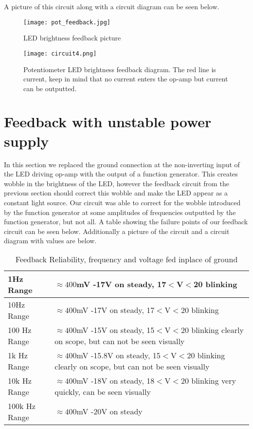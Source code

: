 \documentclass[prl,12pt,notitlepage,aps,onecolumn,superscriptaddress]{revtex4-1}
\begin{document}
A picture of this circuit along with a circuit diagram can be seen below.

\begin{figure}[H]
\begin{center}
\texttt{[image: pot\_feedback.jpg]}
\end{center}
\caption{\label{fig:pic} LED brightness feedback picture}
\end{figure}

\begin{figure}[H]
\begin{center}
\texttt{[image: circuit4.png]}
\end{center}
\caption{\label{fig:pic} Potentiometer LED brightness feedback diagram. The red line is current, keep in mind that no current enters the op-amp but current can be outputted.}
\end{figure}

\section{Feedback with unstable power supply}
In this section we replaced the ground connection at the non-inverting input of the LED driving op-amp with the output of a function generator. This creates wobble in the brightness of the LED, however the feedback circuit from the previous section should correct this wobble and make the LED appear as a constant light source. Our circuit was able to correct for the wobble introduced by the function generator at some amplitudes of frequencies outputted by the function generator, but not all. A table showing the failure points of our feedback circuit can be seen below. Additionally a picture of the circuit and a circuit diagram with values are below.

\begin{table}[h]
 \centering
 \caption{Feedback Reliability, frequency and voltage fed inplace of ground}
   \begin{tabular}{|l|l|}
   \toprule
   1Hz Range & $\approx 400$mV -17V on steady, 17$<$V$<$20 blinking \\
   \midrule
   10Hz Range & $\approx 400$mV -17V on steady, 17$<$V$<$20 blinking \\
   100 Hz Range & $\approx 400$mV -15V on steady, 15$<$V$<$20 blinking clearly on scope, but can not be seen visually \\
   1k Hz Range & $\approx 400$mV -15.8V on steady, 15$<$V$<$20 blinking clearly on scope, but can not be seen visually \\
   10k Hz Range & $\approx 400$mV -18V on steady, 18$<$V$<$20 blinking very quickly, can be seen visually \\
   100k Hz Range & $\approx 400$mV -20V on steady \\
   \bottomrule
   \end{tabular}%
 \label{tab:addlabel}%
\end{table}%
\end{document}
